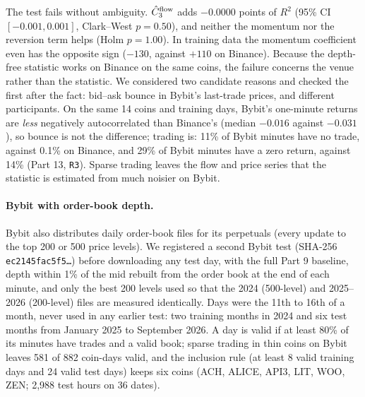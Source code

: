 \documentclass[12pt]{article}
\theoremstyle{definition}
\theoremstyle{remark}
\begin{document}
The test fails without ambiguity. $\hat C_3^{\rm flow}$ adds $-0.0000$ points of $R^2$ (95\% CI $[-0.001,0.001]$, Clark--West $p=0.50$), and neither the momentum nor the reversion term helps (Holm $p=1.00$). In training data the momentum coefficient even has the opposite sign ($-130$, against $+110$ on Binance). Because the depth-free statistic works on Binance on the same coins, the failure concerns the venue rather than the statistic. We considered two candidate reasons and checked the first after the fact: bid--ask bounce in Bybit's last-trade prices, and different participants. On the same 14 coins and training days, Bybit's one-minute returns are \emph{less} negatively autocorrelated than Binance's (median $-0.016$ against $-0.031$), so bounce is not the difference; trading is: 11\% of Bybit minutes have no trade, against 0.1\% on Binance, and 29\% of Bybit minutes have a zero return, against 14\% (Part 13, \texttt{R3}). Sparse trading leaves the flow and price series that the statistic is estimated from much noisier on Bybit.


\paragraph{Bybit with order-book depth.} Bybit also distributes daily order-book files for its perpetuals (every update to the top 200 or 500 price levels). We registered a second Bybit test (SHA-256 \texttt{ec2145fac5f5\ldots}) before downloading any test day, with the full Part 9 baseline, depth within 1\% of the mid rebuilt from the order book at the end of each minute, and only the best 200 levels used so that the 2024 (500-level) and 2025--2026 (200-level) files are measured identically. Days were the 11th to 16th of a month, never used in any earlier test: two training months in 2024 and six test months from January 2025 to September 2026. A day is valid if at least 80\% of its minutes have trades and a valid book; sparse trading in thin coins on Bybit leaves 581 of 882 coin-days valid, and the inclusion rule (at least 8 valid training days and 24 valid test days) keeps six coins (ACH, ALICE, API3, LIT, WOO, ZEN; 2{,}988 test hours on 36 dates).
\end{document}

